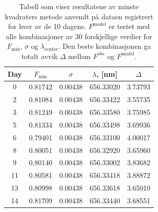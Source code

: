 \documentclass[reprint, english,notitlepage]{revtex4-1}  %
\begin{document}
\begin{table}[p]
\begin{adjustbox}{width=1\textwidth}
\begin{tabular}{||c | c | c | c | c||}
\hline
Day & $F_{\text{min}}$ & $\sigma$ & $\lambda$, [nm] & $\Delta$ \\ \hline\hline
0 & 0.81742 & 0.00438 & 656.33020 & 3.73793    \\ \hline
2 & 0.81084 & 0.00438 & 656.33422 & 3.55735    \\ \hline
3 & 0.81249 & 0.00438 & 656.33580 & 3.75985    \\ \hline
5 & 0.81334 & 0.00438 & 656.33498 & 3.69936    \\ \hline
6 & 0.79401 & 0.00438 & 656.33100 & 4.00017    \\ \hline
8 & 0.80051 & 0.00438 & 656.32920 & 3.65960    \\ \hline
9 & 0.80140 & 0.00438 & 656.33002 & 3.83682    \\ \hline
11 & 0.80581 & 0.00438 & 656.33418 & 3.88872    \\ \hline
13 & 0.80998 & 0.00438 & 656.33618 & 3.65010    \\ \hline
14 & 0.81709 & 0.00438 & 656.33440 & 3.68551    \\ \hline
\end{tabular}
\end{adjustbox}
\caption{Tabell som viser resultatene av minste kvadraters metode anvendt på dataen registrert for hver av de 10 dagene. $F^{\text{model}}$ er testet med alle kombinasjoner av 30 forskjellige verdier for $F_{\text{min}}$, $\sigma$ og $\lambda_{\text{center}}$. Den beste kombinasjonen ga totalt avvik $\Delta$ mellom $F^{obs}$ og $F^{\text{model}}$.}
\label{fig:table}
\end{table}
\end{document}
